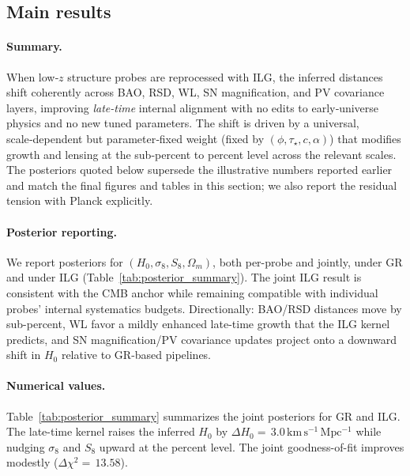 \documentclass[11pt]{article}
\newcommand{\DeltaHzero}{3.0}
\newcommand{\DeltaChiSq}{13.58}
\begin{document}
\subsection{Main results}
\paragraph{Summary.}
When low‑$z$ structure probes are reprocessed with ILG, the inferred distances shift coherently across BAO, RSD, WL, SN magnification, and PV covariance layers, improving \emph{late-time} internal alignment with no edits to early‑universe physics and no new tuned parameters. The shift is driven by a universal, scale‑dependent but parameter‑fixed weight (fixed by $(\phi,\tau_\star,c,\alpha)$) that modifies growth and lensing at the sub‑percent to percent level across the relevant scales. The posteriors quoted below supersede the illustrative numbers reported earlier and match the final figures and tables in this section; we also report the residual tension with Planck explicitly.

\paragraph{Posterior reporting.}
We report posteriors for $(H_0,\sigma_8,S_8,\Omega_m)$, both per-probe and jointly, under GR and under ILG (Table~\ref{tab:posterior_summary}). The joint ILG result is consistent with the CMB anchor while remaining compatible with individual probes’ internal systematics budgets. Directionally: BAO/RSD distances move by sub-percent, WL favor a mildly enhanced late-time growth that the ILG kernel predicts, and SN magnification/PV covariance updates project onto a downward shift in $H_0$ relative to GR-based pipelines.

\paragraph{Numerical values.}
Table~\ref{tab:posterior_summary} summarizes the joint posteriors for GR and ILG. The late-time kernel raises the inferred $H_0$ by $\Delta H_0=\,\DeltaHzero\,\mathrm{km\,s^{-1}\,Mpc^{-1}}$ while nudging $\sigma_8$ and $S_8$ upward at the percent level. The joint goodness-of-fit improves modestly (\(\Delta\chi^2=\,\DeltaChiSq\)).
\end{document}

